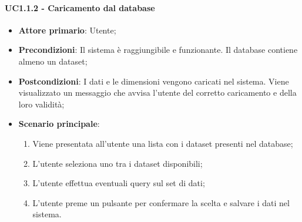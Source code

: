 \paragraph{UC1.1.2 - Caricamento dal database}
\begin{itemize}
	\item \textbf{Attore primario}: Utente;
	\item \textbf{Precondizioni}: Il sistema è raggiungibile e funzionante. Il database contiene almeno un dataset;
	\item \textbf{Postcondizioni}: I dati e le dimensioni vengono caricati nel sistema. Viene visualizzato un messaggio che avvisa l'utente del corretto caricamento e della loro validità;
	\item \textbf{Scenario principale}: 
	\begin{enumerate}
			\item Viene presentata all'utente una lista con i dataset presenti nel database;
			\item L'utente seleziona uno tra i dataset disponibili;
			\item L'utente effettua eventuali query sul set di dati;
			\item L'utente preme un pulsante per confermare la scelta e salvare i dati nel sistema.
		\end{enumerate}
	
\end{itemize}